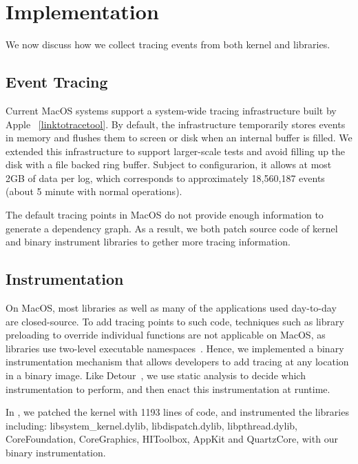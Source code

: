 \section{Implementation}\label{sec:implementation}
We now discuss how we collect tracing events from both kernel and libraries.

\subsection{Event Tracing}

Current MacOS systems support a system-wide tracing infrastructure built by
Apple ~\ref{linktotracetool}. By default, the infrastructure temporarily stores
events in memory and flushes them to screen or disk when an internal buffer is
filled. We extended this infrastructure to support larger-scale tests and avoid
filling up the disk with a file backed ring buffer. Subject to configurarion,
it allows at most 2GB of data per log, which corresponds to approximately
18,560,187 events (about 5 minute with normal operations).

The default tracing points in MacOS do not provide enough information to
generate a dependency graph. As a result, we both patch source code of kernel
and binary instrument libraries to gether more tracing information.

\subsection{Instrumentation}

On MacOS, most libraries as well as many of the applications used day-to-day are
closed-source. To add tracing points to such code, techniques such as library
preloading to override individual functions are not applicable on MacOS, as
libraries use two-level executable namespaces~\cite{}. Hence, we implemented
a binary instrumentation mechanism that allows developers to add tracing at
any location in a binary image. Like Detour~\cite{hunt1999detours}, we use
static analysis to decide which instrumentation to perform, and then enact this
instrumentation at runtime.

In \xxx, we patched the kernel with 1193 lines of code, and instrumented
the libraries including: libsystem\_kernel.dylib, libdispatch.dylib,
libpthread.dylib, CoreFoundation, CoreGraphics, HIToolbox, AppKit and QuartzCore,
with our binary instrumentation. 

